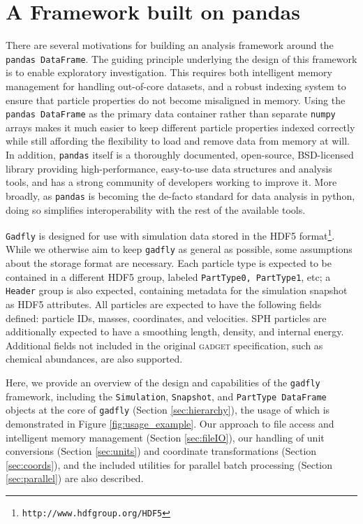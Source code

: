 \documentclass{thesis}
\newcommand{\code}[1]{\texttt{#1}}
\begin{document}
\section{A Framework built on pandas}
\label{sec:framework}

There are several motivations for building an analysis framework around the \code{pandas DataFrame}. 
The guiding principle underlying the design of this framework is to enable exploratory investigation.
This requires both intelligent memory management for handling out-of-core datasets, and a robust indexing system to ensure that particle properties do not become misaligned in memory.
Using  the \code{pandas DataFrame} as the primary data container rather than separate \code{numpy} arrays makes it much easier to keep different particle properties indexed correctly while still affording the flexibility to load and remove data from memory at will.
In addition, \code{pandas} itself is a thoroughly documented, open-source, BSD-licensed library providing high-performance, easy-to-use data structures and analysis tools, and has a strong community of developers working to improve it.  
More broadly, as \code{pandas} is becoming the de-facto standard for data analysis in python, doing so simplifies interoperability with the rest of the available tools.

\code{Gadfly} is designed for use with simulation data stored in the HDF5 format\footnote{\code{http://www.hdfgroup.org/HDF5}}.
While we otherwise aim to keep \code{gadfly} as general as possible, some assumptions about the storage format are necessary.
Each particle type is expected to be contained in a different HDF5 group, labeled \code{PartType0, PartType1}, etc; a \code{Header} group is also expected, containing metadata for the simulation snapshot as HDF5 attributes. 
All particles are expected to have the following fields defined: particle IDs, masses, coordinates, and velocities.  
SPH particles are additionally expected to have a smoothing length, density, and internal energy.  Additional fields not included in the original \textsc{gadget} specification, such as chemical abundances, are also supported.

Here, we provide an overview of the design and capabilities of the \code{gadfly} framework, including the \code{Simulation}, \code{Snapshot}, and \code{PartType DataFrame} objects at the core of \code{gadfly} (Section \ref{sec:hierarchy}), the usage of which is demonstrated in Figure \ref{fig:usage_example}.
Our approach to file access and intelligent memory management (Section \ref{sec:fileIO}), our handling of unit conversions (Section \ref{sec:units}) and coordinate transformations (Section \ref{sec:coords}), and the included utilities for parallel batch processing (Section \ref{sec:parallel}) are also described.
\end{document}
